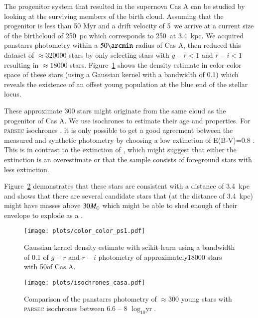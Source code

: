 \documentclass{aa}
\begin{document}
\begin{appendix}
The progenitor system that resulted in the supernova Cas A can be studied by looking at the surviving members of the birth cloud. Assuming that the progenitor is less than 50 Myr and a drift velocity of 5~\kms we arrive at a current size of the birthcloud of 250~pc which corresponds to 250\arcmin\ at 3.4~kpc. We acquired \gls{panstarrs} photometry within a $50\arcmin$ radius of Cas A, then reduced this dataset of $\approx\num{320000}$ stars by only selecting stars with $g-r<1$ and $r-i<1$ resulting in $\approx\num{18000}$ stars. Figure~\ref{fig:panstarrs_cc} shows the density estimate in color-color space of these stars (using a Gaussian kernel with a bandwidth of 0.1) which reveals the existence of an offset young population at the blue end of the stellar locus.

These approximate 300 stars might originate from the same cloud as the progenitor of Cas A. We use isochrones to estimate their age and properties. For \textsc{parsec} isochrones \citep{2017ApJ...835...77M}, it is only possible to get a good agreement between the measured and synthetic photometry by choosing a low extinction of E(B-V)=0.8 \citep[similar to extinction measurements near Cas A presented in][]{2015ApJ...810...25G}.
This is in contrast to the extinction of \citet{2017MNRAS.465.3309D}, which might suggest that either the extinction is an overestimate or that the sample consists of foreground stars with less extinction.

Figure~\ref{fig:isochrone} demonstrates that these stars are consistent with a distance of 3.4~kpc and shows that there are several candidate stars that (at the distance of 3.4~kpc) might have masses above $30\hbox{$M_{\odot}$}$ which might be able to shed enough of their envelope to explode as a \sniib.
\begin{figure}[h!]
 \centering
	 \texttt{[image: plots/color\_color\_ps1.pdf]}
         \caption{Gaussian kernel density estimate with \gls{scikit-learn} using a bandwidth of 0.1 of $g-r$ and $r-i$ photometry of approximately$\num{18000}$ stars with 50\arcmin of Cas A.}
       \label{fig:panstarrs_cc}
\end{figure}

\begin{figure}[h!]
 \centering
	 \texttt{[image: plots/isochrones\_casa.pdf]}
         \caption{Comparison of the \gls{panstarrs} photometry of $\approx300$ young stars with \textsc{parsec} isochrones \citep{2017ApJ...835...77M} between 6.6 -- 8 $\log_{10}{\textrm{yr}}$.}
       \label{fig:isochrone}
\end{figure}

\end{appendix}
\end{document}
